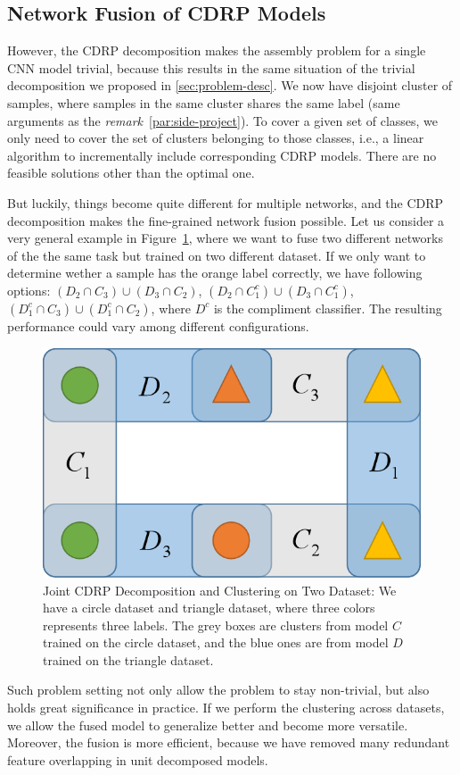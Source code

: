 \documentclass[acmsmall,nonacm]{acmart}\settopmatter{}
\begin{document}
\subsection{Network Fusion of CDRP Models}
However, the CDRP decomposition makes the assembly problem for a single CNN model trivial, because this results in the same situation of the trivial decomposition we proposed in \cref{sec:problem-desc}.
We now have disjoint cluster of samples, where samples in the same cluster shares the same label (same arguments as the \textit{remark}~\ref{par:side-project}).
To cover a given set of classes, we only need to cover the set of clusters belonging to those classes, i.e., a linear algorithm to incrementally include corresponding CDRP models.
There are no feasible solutions other than the optimal one.

But luckily, things become quite different for multiple networks, and the CDRP decomposition makes the fine-grained network fusion possible.
Let us consider a very general example in Figure~\ref{fig:fusion-example}, where we want to fuse two different networks of the the same task but trained on two different dataset.
If we only want to determine wether a sample has the orange label correctly, we have following options: $(D_2 \cap C_3) \cup (D_3 \cap C_2)$, $(D_2 \cap C_1^c) \cup (D_3 \cap C_1^c)$, $(D_1^c \cap C_3) \cup (D_1^c \cap C_2)$, where $D^c$ is the compliment classifier.
The resulting performance could vary among different configurations.

\begin{figure}[h]
  \centering
  \includegraphics[width=0.38\linewidth]{fig/fusion_example.png}
  \caption{Joint CDRP Decomposition and Clustering on Two Dataset:
  We have a circle dataset and triangle dataset, where three colors represents three labels.
  The grey boxes are clusters from model $C$ trained on the circle dataset, and the blue ones are from model $D$ trained on the triangle dataset.}
  \label{fig:fusion-example}
\end{figure}

Such problem setting not only allow the problem to stay non-trivial, but also holds great significance in practice.
If we perform the clustering across datasets, we allow the fused model to generalize better and become more versatile.
Moreover, the fusion is more efficient, because we have removed many redundant feature overlapping in unit decomposed models.
\end{document}

